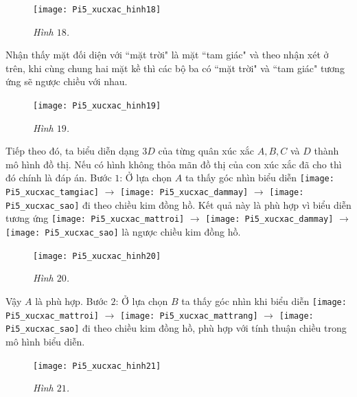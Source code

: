 \begin{multicols}{2}
	\begin{figure}[H]
		\centering
		\captionsetup{labelformat= empty, justification=centering}
		\texttt{[image: Pi5\_xucxac\_hinh18]}
		\caption{\small\textit{\color{toancuabi}Hình $18$.}}
		\vspace*{-10pt}
	\end{figure}
	Nhận thấy mặt đối diện với ``mặt trời" là mặt ``tam giác"   và theo nhận xét ở trên, khi cùng chung hai mặt kề thì các bộ ba có ``mặt trời" và ``tam giác" tương ứng sẽ ngược chiều với nhau.
	\begin{figure}[H]
		\vspace*{-5pt}
		\centering
		\captionsetup{labelformat= empty, justification=centering}
		\texttt{[image: Pi5\_xucxac\_hinh19]}
		\caption{\small\textit{\color{toancuabi}Hình $19$.}}
		\vspace*{-10pt}
	\end{figure}
	Tiếp theo đó, ta biểu diễn dạng $3D$ của từng quân xúc xắc $A, B, C$ và $D$ thành mô hình đồ thị. Nếu có hình không thỏa mãn đồ thị của con xúc xắc đã cho thì đó chính là đáp án.
	\vskip 0.1cm
	Bước $1$: Ở lựa chọn $A$ ta thấy góc nhìn biểu diễn  \texttt{[image: Pi5\_xucxac\_tamgiac]} $\to$ \texttt{[image: Pi5\_xucxac\_dammay]} $\to$
	\texttt{[image: Pi5\_xucxac\_sao]}  đi theo chiều kim đồng hồ. Kết quả này là phù hợp vì biểu diễn tương ứng  \texttt{[image: Pi5\_xucxac\_mattroi]} $\to$ \texttt{[image: Pi5\_xucxac\_dammay]} $\to$
	\texttt{[image: Pi5\_xucxac\_sao]}   là ngược chiều kim đồng hồ.
	\begin{figure}[H]
		\vspace*{-5pt}
		\centering
		\captionsetup{labelformat= empty, justification=centering}
		\texttt{[image: Pi5\_xucxac\_hinh20]}
		\caption{\small\textit{\color{toancuabi}Hình $20$.}}
		\vspace*{-5pt}
	\end{figure}
	Vậy $A$ là phù hợp.
	\vskip 0.1cm
	Bước $2$: Ở lựa chọn $B$ ta thấy góc nhìn khi biểu diễn  \texttt{[image: Pi5\_xucxac\_mattroi]} $\to$ \texttt{[image: Pi5\_xucxac\_mattrang]} $\to$
	\texttt{[image: Pi5\_xucxac\_sao]}   đi theo chiều kim đồng hồ, phù hợp với tính thuận chiều trong mô hình biểu diễn.
	\begin{figure}[H]
		\vspace*{-5pt}
		\centering
		\captionsetup{labelformat= empty, justification=centering}
		\texttt{[image: Pi5\_xucxac\_hinh21]}
		\caption{\small\textit{\color{toancuabi}Hình $21$.}}
		\vspace*{-10pt}

\end{figure}
\end{multicols}
